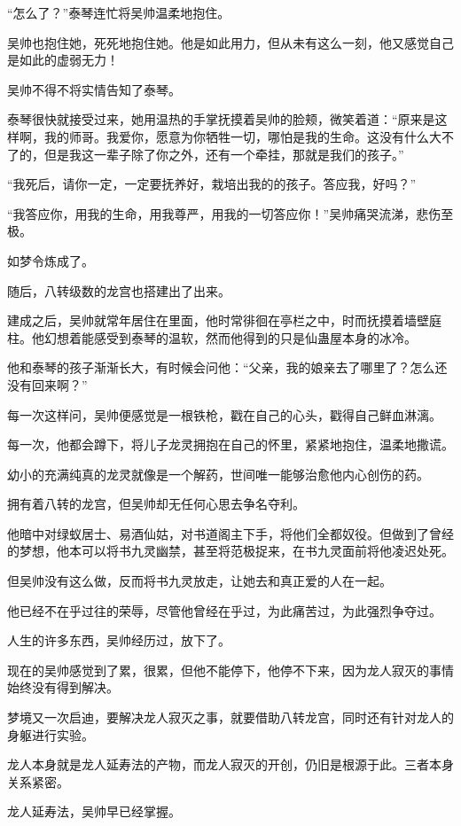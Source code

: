 \begin{this_body}
“怎么了？”泰琴连忙将吴帅温柔地抱住。

吴帅也抱住她，死死地抱住她。他是如此用力，但从未有这么一刻，他又感觉自己是如此的虚弱无力！

吴帅不得不将实情告知了泰琴。

泰琴很快就接受过来，她用温热的手掌抚摸着吴帅的脸颊，微笑着道：“原来是这样啊，我的师哥。我爱你，愿意为你牺牲一切，哪怕是我的生命。这没有什么大不了的，但是我这一辈子除了你之外，还有一个牵挂，那就是我们的孩子。”

“我死后，请你一定，一定要抚养好，栽培出我的的孩子。答应我，好吗？”

“我答应你，用我的生命，用我尊严，用我的一切答应你！”吴帅痛哭流涕，悲伤至极。

如梦令炼成了。

随后，八转级数的龙宫也搭建出了出来。

建成之后，吴帅就常年居住在里面，他时常徘徊在亭栏之中，时而抚摸着墙壁庭柱。他幻想着能感受到泰琴的温软，然而他得到的只是仙蛊屋本身的冰冷。

他和泰琴的孩子渐渐长大，有时候会问他：“父亲，我的娘亲去了哪里了？怎么还没有回来啊？”

每一次这样问，吴帅便感觉是一根铁枪，戳在自己的心头，戳得自己鲜血淋漓。

每一次，他都会蹲下，将儿子龙灵拥抱在自己的怀里，紧紧地抱住，温柔地撒谎。

幼小的充满纯真的龙灵就像是一个解药，世间唯一能够治愈他内心创伤的药。

拥有着八转的龙宫，但吴帅却无任何心思去争名夺利。

他暗中对绿蚁居士、易酒仙姑，对书道阁主下手，将他们全都奴役。但做到了曾经的梦想，他本可以将书九灵幽禁，甚至将范极捉来，在书九灵面前将他凌迟处死。

但吴帅没有这么做，反而将书九灵放走，让她去和真正爱的人在一起。

他已经不在乎过往的荣辱，尽管他曾经在乎过，为此痛苦过，为此强烈争夺过。

人生的许多东西，吴帅经历过，放下了。

现在的吴帅感觉到了累，很累，但他不能停下，他停不下来，因为龙人寂灭的事情始终没有得到解决。

梦境又一次启迪，要解决龙人寂灭之事，就要借助八转龙宫，同时还有针对龙人的身躯进行实验。

龙人本身就是龙人延寿法的产物，而龙人寂灭的开创，仍旧是根源于此。三者本身关系紧密。

龙人延寿法，吴帅早已经掌握。


\end{this_body}
